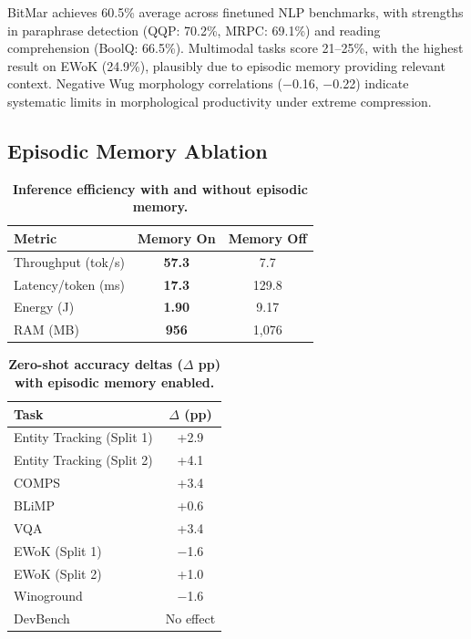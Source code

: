 BitMar achieves 60.5\% average across finetuned NLP benchmarks, with strengths in paraphrase detection (QQP: 70.2\%, MRPC: 69.1\%) and reading comprehension (BoolQ: 66.5\%). Multimodal tasks score 21--25\%, with the highest result on EWoK (24.9\%), plausibly due to episodic memory providing relevant context. Negative Wug morphology correlations ($-$0.16, $-$0.22) indicate systematic limits in morphological productivity under extreme compression.

\subsection{Episodic Memory Ablation}

\begin{table}[htbp]
\centering
\caption{\textbf{Inference efficiency with and without episodic memory.}}
\label{tab:bitmar_eff_ablation}
\begin{tabular}{lcc}
\toprule
\textbf{Metric} & \textbf{Memory On} & \textbf{Memory Off} \\
\midrule
Throughput (tok/s) & \textbf{57.3} & 7.7 \\
Latency/token (ms) & \textbf{17.3} & 129.8 \\
Energy (J) & \textbf{1.90} & 9.17 \\
RAM (MB) & \textbf{956} & 1{,}076 \\
\bottomrule
\end{tabular}
\end{table}

\begin{table}[htbp]
\centering
\caption{\textbf{Zero-shot accuracy deltas ($\Delta$ pp) with episodic memory enabled.}}
\label{tab:bitmar_acc_ablation}
\begin{tabular}{lc}
\toprule
\textbf{Task} & \textbf{$\Delta$ (pp)} \\
\midrule
Entity Tracking (Split 1) & +2.9 \\
Entity Tracking (Split 2) & +4.1 \\
COMPS & +3.4 \\
BLiMP & +0.6 \\
VQA & +3.4 \\
EWoK (Split 1) & $-$1.6 \\
EWoK (Split 2) & +1.0 \\
Winoground & $-$1.6 \\
DevBench & No effect \\
\bottomrule
\end{tabular}
\end{table}


